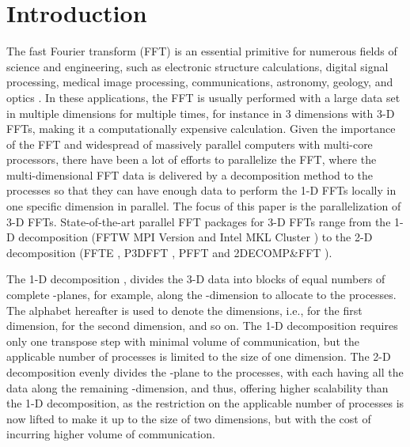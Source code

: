 \section{Introduction}
\label{Introduction}

The fast Fourier transform (FFT) \cite{citeulike:1436613} is an essential primitive for numerous fields of science and engineering, such as electronic structure calculations, digital signal processing, medical image processing, communications, astronomy, geology, and optics \cite{Haynes2000130,Clarke199214,Broughton2008,Gonzales1992}. In these applications, the FFT is usually performed with a large data set in multiple dimensions for multiple times, for instance in 3 dimensions with 3-D FFTs, making it a computationally expensive calculation. Given the importance of the FFT and widespread of massively parallel computers with multi-core processors, there have been a lot of efforts to parallelize the FFT, where the multi-dimensional FFT data is delivered by a decomposition method to the processes so that they can have enough data to perform the 1-D FFTs locally in one specific dimension in parallel. The focus of this paper is the parallelization of 3-D FFTs. State-of-the-art parallel FFT packages for 3-D FFTs range from the 1-D decomposition (FFTW MPI Version \cite{FFTW} and Intel MKL Cluster \cite{MKL}) to the 2-D decomposition (FFTE \cite{takahashi2010implementation,ffte}, P3DFFT \cite{doi:10.1137/11082748X,p3dfft}, PFFT \cite{doi:10.1137/120885887,pfft} and 2DECOMP\&FFT \cite{Li2010,2DECOMP}). 

The 1-D decomposition \cite{Haynes2000130,Dmitruk20011921}, divides the 3-D data into blocks of equal numbers of complete -planes, for example, along the -dimension to allocate to the processes. The alphabet hereafter is used to denote the dimensions, i.e.,  for the first dimension,  for the second dimension, and so on. The 1-D decomposition requires only one transpose step with minimal volume of communication, but the applicable number of processes is limited to the size of one dimension. 
The 2-D decomposition \cite{Ayala2012,takahashi2010implementation} evenly divides the -plane to the processes, with each having all the data along the remaining -dimension, and thus, offering higher scalability than the 1-D decomposition, as the restriction on the applicable number of processes is now lifted to make it up to the size of two dimensions, but with the cost of incurring higher volume of communication. 





